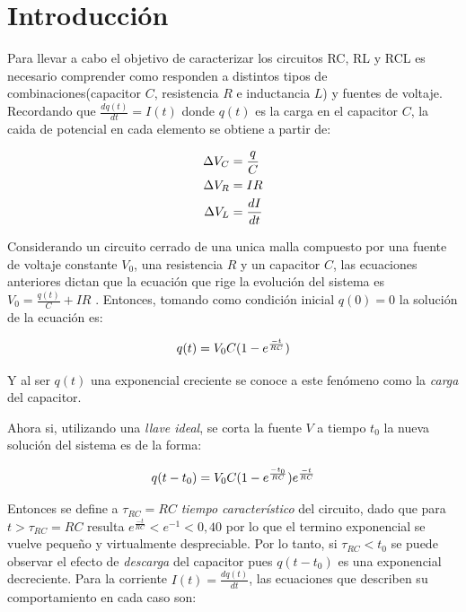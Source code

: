 \documentclass[11pt,a4paper]{article}
\begin{document}
\section{Introducción}\label{sec:intro}
Para llevar a cabo el objetivo de caracterizar los circuitos RC, RL y RCL es necesario comprender como responden a distintos tipos de combinaciones(capacitor $C$, resistencia $R$ e inductancia $L$) y fuentes de voltaje. Recordando que $\frac{dq(t)}{dt} = I(t)$ donde $q(t)$ es la carga en el capacitor $C$, la caida de potencial en cada elemento se obtiene a partir de:

\begin{equation}{\label{leyes}}
\begin{split}
\Delta V_C &= \frac{q}{C}\\
\Delta V_R &= IR\\
\Delta V_L &= \frac{dI}{dt}
\end{split}
\end{equation}

Considerando un circuito cerrado de una unica malla compuesto por una fuente de voltaje constante $V_{0}$, una resistencia $R$ y un capacitor $C$, las ecuaciones anteriores dictan que la ecuación que rige la evolución del sistema es $V_{0} = \frac{q(t)}{C}+IR$ \cite{Trelles}. Entonces, tomando como condición inicial $q(0)=0$ la solución de la ecuación es:
   
\begin{equation}{\label{RC_carga}}
q(t)=V_{0}C(1-e^\frac{-t}{RC})
\end{equation}

Y al ser $q(t)$ una exponencial creciente se conoce a este fenómeno como la \textit{carga} del capacitor.

Ahora si, utilizando una \textit{llave ideal}, se corta la fuente $V$ a tiempo $t_{0}$ la nueva solución del sistema es de la forma:

\begin{equation}{\label{RC_descarga}}
q(t-t_{0})=V_{0}C(1-e^\frac{-t_{0}}{RC})e^\frac{-t}{RC}
\end{equation}

Entonces se define a $\tau_{RC}=RC$ \textit{tiempo característico} del circuito, dado que para $t>\tau_{RC}=RC$ resulta $e^\frac{-t}{RC}<e^{-1}<0,40$ por lo que el termino exponencial se vuelve pequeño y virtualmente despreciable. Por lo tanto, si $\tau_{RC}<t_{0}$ se puede observar el efecto de \textit{descarga} del capacitor pues $q(t-t_{0})$ es una exponencial decreciente. Para la corriente $I(t) = \frac{dq(t)}{dt}$, las ecuaciones que describen su comportamiento en cada caso son:
\end{document}
